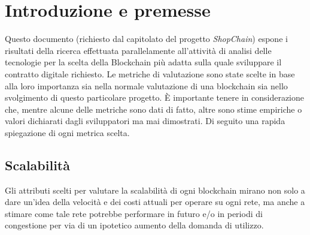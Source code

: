 \documentclass[a4paper, 12pt]{article}
\begin{document}
\makefrontpage

\makeversioni

\section*{Introduzione e premesse}
Questo documento (richiesto dal capitolato del progetto \textit{ShopChain}) espone i risultati della ricerca effettuata parallelamente all'attività di analisi delle tecnologie per la scelta della Blockchain più adatta sulla quale sviluppare il contratto digitale richiesto.
Le metriche di valutazione sono state scelte in base alla loro importanza sia nella normale valutazione di una blockchain sia nello svolgimento di questo particolare progetto.
È importante tenere in considerazione che, mentre alcune delle metriche sono dati di fatto, altre sono stime empiriche o valori dichiarati dagli sviluppatori ma mai dimostrati.
Di seguito una rapida spiegazione di ogni metrica scelta.

\subsection*{Scalabilità}
Gli attributi scelti per valutare la scalabilità di ogni blockchain mirano non solo a dare un'idea della velocità e dei costi attuali per operare su ogni rete, ma anche a stimare come tale
rete potrebbe performare in futuro e/o in periodi di congestione per via di un ipotetico aumento della domanda di utilizzo.
\end{document}
